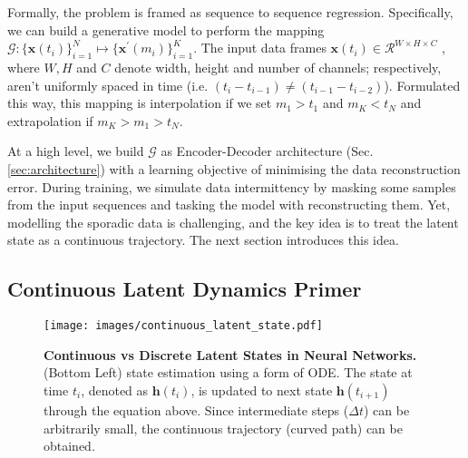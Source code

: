 \documentclass[10pt, conference, compsocconf]{IEEEtran}
\def\update#1{#1}
\begin{document}
Formally,  the problem is framed as sequence to sequence regression. Specifically, we can build a generative model to perform the mapping
$\mathcal{G} : \big\{\mathbf{x}(t_i)\big \}^N_{i=1} \mapsto \big\{\mathbf{x}^{\prime}(m_i)\big\}^K_{i=1}$. 
The input data frames $\mathbf{x}(t_i) \in \mathcal{R}^{W\times H \times C}$
, where  $W, H$ and $C$  denote width, height and number of channels; respectively, aren't uniformly spaced in time
(i.e. $(t_i - t_{i-1}) \neq (t_{i-1} - t_{i-2}) $). 
Formulated this way, this mapping is interpolation if we set $m_1 > t_1$ and $m_K<t_N$ and extrapolation if  $m_K> m_1 > t_N$. 

At \update{a high} level, we build $\mathcal{G}$ as Encoder-Decoder architecture (Sec. \ref{sec:architecture}) with a learning objective of minimising the data reconstruction error. During training, we simulate data intermittency by masking some samples from the input sequences and tasking the model with reconstructing them.  
Yet, modelling the sporadic data is challenging, and the key idea is to treat the \update{latent state} as a continuous trajectory. \update{The next} section introduces this idea.




\subsection{Continuous Latent Dynamics Primer}
\label{sec:latent_dynamics}

\begin{figure}[t]
    \centering
    \texttt{[image: images/continuous\_latent\_state.pdf]}
    \caption{\textbf{Continuous vs Discrete Latent States in Neural Networks.} (Bottom Left) state estimation using a form of ODE. The state at time $t_i$, denoted as $\mathbf{h}(t_i)$, is updated to next state $\mathbf{h}(t_{i+1})$ through the equation above. Since intermediate steps ($\Delta t$) can be arbitrarily small, the continuous trajectory (curved path) can be obtained. }
    \label{fig:continuous_latent_state}
\end{figure}
\end{document}
